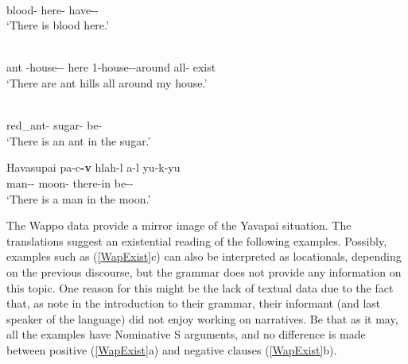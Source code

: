 \begin{exe} \citep[Yuman; Arizona; ][28, 98]{Kendall:1976}\nopagebreak[4]
\begin{xlist} 
\ex\gll{}  \\
blood-\nom{} here-\loc{} have-\appl{}-\faff{}\\
\glt `There is blood here.' %

\ex\gll{}     \\
ant \poss{}-house-\pl{}-\nom{} here 1-house-\dem{}-around all-\tns{} exist\\
\glt `There are ant hills all around my house.'

\ex\gll{}  \\
red\_ant-\nom{} sugar-\loc{} be-\faff{}\\
\glt `There is an ant in the sugar.'
\end{xlist}
\end{exe}


\begin{exe}\ex\label{HavEx} {Havasupai} \citep[Yuman; Arizona; ][61]{Kozlowski:1972}\nopagebreak
\gll pa-c\textbf{-v} hlah-l \texttheta a-l yu-k-yu\\
man-\dem{}-\nom{} moon-\loc{} there-in be-\ind{}-\aux{}\\
\glt `There is a man in the moon.' \end{exe}

The Wappo data provide a mirror image of the Yavapai situation. 
The translations suggest an existential reading of the following examples.
Possibly, examples such as (\ref{WapExist}c) can also be interpreted as locationals, depending on the previous discourse, but the grammar does not provide any information on this topic.
One reason for this might be the lack of textual data due to the fact that, as \citet{Thompsonetal:2006} note in the introduction to their grammar, their informant (and last speaker of the language) did not enjoy working on narratives. 
Be that as it may, all the examples have Nominative S arguments, and no difference is made between positive (\ref{WapExist}a) and negative clauses (\ref{WapExist}b).

